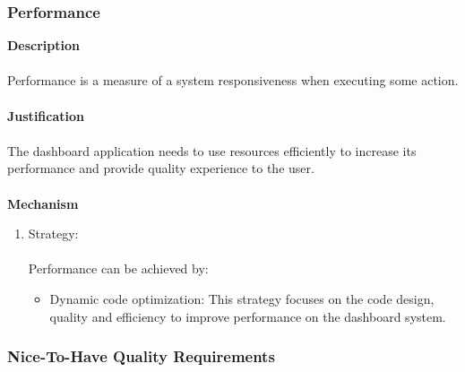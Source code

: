 \documentclass[hidelinks, 12pt, oneside]{article}
\begin{document}
			\subsubsection*{Performance}
			\textbf{Description}\\\\
			Performance is a measure of a system responsiveness when executing some action.\\\\
			\textbf{Justification}\\\\
			The dashboard application needs to use resources efficiently to increase its performance and provide quality experience to the user.\\\\
			\textbf{Mechanism}
			\begin{enumerate}
				\item Strategy:\\\\
				Performance can be achieved by:
				\begin{itemize}
				\item Dynamic code optimization: This strategy focuses on the code design, quality and efficiency to improve performance on the dashboard system.  
				\end{itemize}
			\end{enumerate}	
			
		\newpage
		\subsubsection{Nice-To-Have Quality Requirements}
\end{document}
